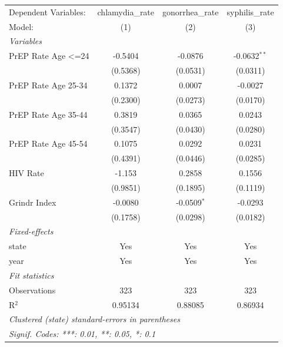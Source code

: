
\begingroup
\centering
\begin{tabular}{lccc}
   \tabularnewline \midrule \midrule
   Dependent Variables: & chlamydia\_rate  & gonorrhea\_rate  & syphilis\_rate\\   
   Model:               & (1)              & (2)              & (3)\\  
   \midrule
   \emph{Variables}\\
   PrEP Rate Age <=24   & -0.5404          & -0.0876          & -0.0632$^{**}$\\   
                        & (0.5368)         & (0.0531)         & (0.0311)\\   
   PrEP Rate Age 25-34  & 0.1372           & 0.0007           & -0.0027\\   
                        & (0.2300)         & (0.0273)         & (0.0170)\\   
   PrEP Rate Age 35-44  & 0.3819           & 0.0365           & 0.0243\\   
                        & (0.3547)         & (0.0430)         & (0.0280)\\   
   PrEP Rate Age 45-54  & 0.1075           & 0.0292           & 0.0231\\   
                        & (0.4391)         & (0.0446)         & (0.0285)\\   
   HIV Rate             & -1.153           & 0.2858           & 0.1556\\   
                        & (0.9851)         & (0.1895)         & (0.1119)\\   
   Grindr Index         & -0.0080          & -0.0509$^{*}$    & -0.0293\\   
                        & (0.1758)         & (0.0298)         & (0.0182)\\   
   \midrule
   \emph{Fixed-effects}\\
   state                & Yes              & Yes              & Yes\\  
   year                 & Yes              & Yes              & Yes\\  
   \midrule
   \emph{Fit statistics}\\
   Observations         & 323              & 323              & 323\\  
   R$^2$                & 0.95134          & 0.88085          & 0.86934\\  
   \midrule \midrule
   \multicolumn{4}{l}{\emph{Clustered (state) standard-errors in parentheses}}\\
   \multicolumn{4}{l}{\emph{Signif. Codes: ***: 0.01, **: 0.05, *: 0.1}}\\
\end{tabular}
\par\endgroup


